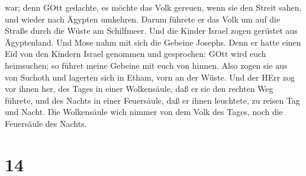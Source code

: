 war; denn GOtt gedachte, es möchte das Volk gereuen, wenn sie den Streit
sahen, und wieder nach Ägypten umkehren.  Darum führete er
das Volk um auf die Straße durch die Wüste am Schilfmeer. Und die Kinder
Israel zogen gerüstet aus Ägyptenland.  Und Mose nahm mit
sich die Gebeine Josephs. Denn er hatte einen Eid von den Kindern Israel
genommen und gesprochen: GOtt wird euch heimsuchen; so führet meine
Gebeine mit euch von hinnen.  Also zogen sie aus von
Suchoth und lagerten sich in Etham, vorn an der Wüste.  Und
der HErr zog vor ihnen her, des Tages in einer Wolkensäule, daß er sie
den rechten Weg führete, und des Nachts in einer Feuersäule, daß er
ihnen leuchtete, zu reisen Tag und Nacht.  Die Wolkensäule
wich nimmer von dem Volk des Tages, noch die Feuersäule des Nachts.

\hypertarget{section-13}{%
\section{14}\label{section-13}}

